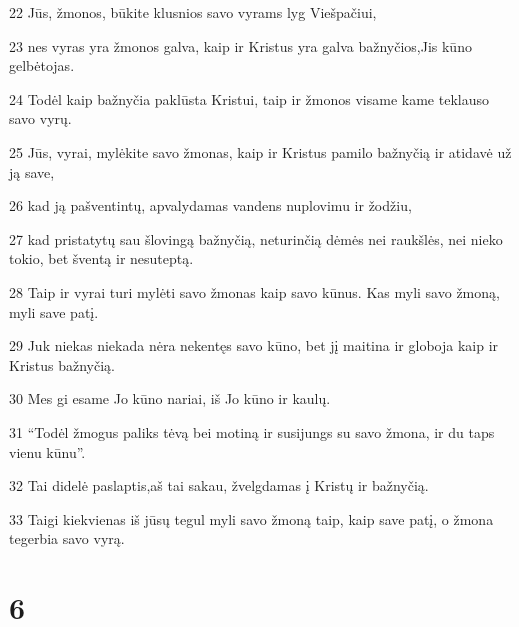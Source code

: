 \par 22 Jūs, žmonos, būkite klusnios savo vyrams lyg Viešpačiui, 
\par 23 nes vyras yra žmonos galva, kaip ir Kristus yra galva bažnyčios,­Jis kūno gelbėtojas. 
\par 24 Todėl kaip bažnyčia paklūsta Kristui, taip ir žmonos visame kame teklauso savo vyrų. 
\par 25 Jūs, vyrai, mylėkite savo žmonas, kaip ir Kristus pamilo bažnyčią ir atidavė už ją save, 
\par 26 kad ją pašventintų, apvalydamas vandens nuplovimu ir žodžiu, 
\par 27 kad pristatytų sau šlovingą bažnyčią, neturinčią dėmės nei raukšlės, nei nieko tokio, bet šventą ir nesuteptą. 
\par 28 Taip ir vyrai turi mylėti savo žmonas kaip savo kūnus. Kas myli savo žmoną, myli save patį. 
\par 29 Juk niekas niekada nėra nekentęs savo kūno, bet jį maitina ir globoja kaip ir Kristus bažnyčią. 
\par 30 Mes gi esame Jo kūno nariai, iš Jo kūno ir kaulų. 
\par 31 “Todėl žmogus paliks tėvą bei motiną ir susijungs su savo žmona, ir du taps vienu kūnu”. 
\par 32 Tai didelė paslaptis,­aš tai sakau, žvelgdamas į Kristų ir bažnyčią. 
\par 33 Taigi kiekvienas iš jūsų tegul myli savo žmoną taip, kaip save patį, o žmona tegerbia savo vyrą.


\chapter{6}


